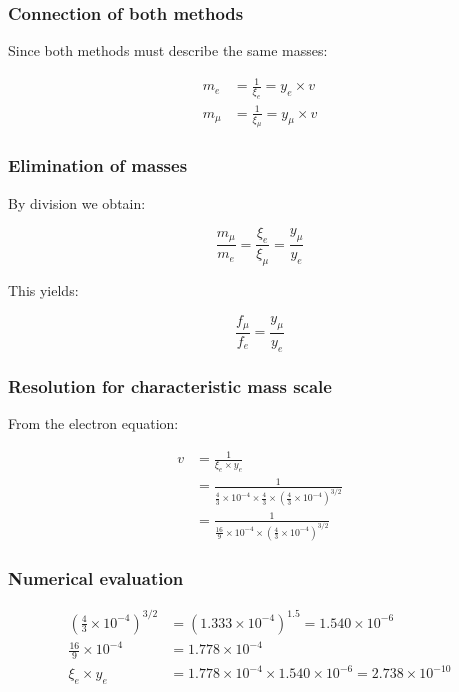 \documentclass[12pt,a4paper]{article}
\begin{document}
\subsubsection{Connection of both methods}

Since both methods must describe the same masses:

\begin{align}
	m_e &= \frac{1}{\xi_e} = y_e \times v\\
	m_\mu &= \frac{1}{\xi_\mu} = y_\mu \times v
\end{align}

\subsubsection{Elimination of masses}

By division we obtain:

\begin{equation}
	\frac{m_\mu}{m_e} = \frac{\xi_e}{\xi_\mu} = \frac{y_\mu}{y_e}
\end{equation}

This yields:

\begin{equation}
	\frac{f_\mu}{f_e} = \frac{y_\mu}{y_e}
\end{equation}

\subsubsection{Resolution for characteristic mass scale}

From the electron equation:

\begin{align}
	v &= \frac{1}{\xi_e \times y_e}\\
	&= \frac{1}{\frac{4}{3} \times 10^{-4} \times \frac{4}{3} \times \left(\frac{4}{3} \times 10^{-4}\right)^{3/2}}\\
	&= \frac{1}{\frac{16}{9} \times 10^{-4} \times \left(\frac{4}{3} \times 10^{-4}\right)^{3/2}}
\end{align}

\subsubsection{Numerical evaluation}

\begin{align}
	\left(\frac{4}{3} \times 10^{-4}\right)^{3/2} &= (1.333 \times 10^{-4})^{1.5} = 1.540 \times 10^{-6}\\
	\frac{16}{9} \times 10^{-4} &= 1.778 \times 10^{-4}\\
	\xi_e \times y_e &= 1.778 \times 10^{-4} \times 1.540 \times 10^{-6} = 2.738 \times 10^{-10}
\end{align}
\end{document}
